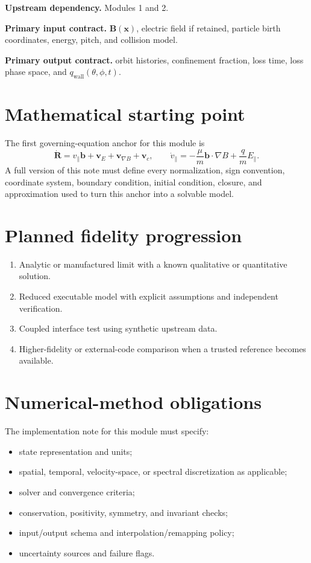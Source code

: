\documentclass[11pt]{article}
\begin{document}
\textbf{Upstream dependency.} Modules 1 and 2.

\textbf{Primary input contract.} $\mathbf B(\mathbf x)$, electric field if retained, particle birth coordinates, energy, pitch, and collision model.

\textbf{Primary output contract.} orbit histories, confinement fraction, loss time, loss phase space, and $q_{\mathrm{wall}}(\theta,\phi,t)$.

\section{Mathematical starting point}
The first governing-equation anchor for this module is
\begin{equation}
\dot{\mathbf R}=v_{\parallel}\mathbf b+\mathbf v_E+\mathbf v_{\nabla B}+\mathbf v_c,\qquad \dot v_{\parallel}=-\frac{\mu}{m}\mathbf b\cdot\nabla B+\frac{q}{m}E_{\parallel}.
\end{equation}
A full version of this note must define every normalization, sign convention, coordinate system, boundary condition, initial condition, closure, and approximation used to turn this anchor into a solvable model.

\section{Planned fidelity progression}
\begin{enumerate}[leftmargin=1.6em]
\item Analytic or manufactured limit with a known qualitative or quantitative solution.
\item Reduced executable model with explicit assumptions and independent verification.
\item Coupled interface test using synthetic upstream data.
\item Higher-fidelity or external-code comparison when a trusted reference becomes available.
\end{enumerate}

\section{Numerical-method obligations}
The implementation note for this module must specify:
\begin{itemize}[leftmargin=1.6em]
\item state representation and units;
\item spatial, temporal, velocity-space, or spectral discretization as applicable;
\item solver and convergence criteria;
\item conservation, positivity, symmetry, and invariant checks;
\item input/output schema and interpolation/remapping policy;
\item uncertainty sources and failure flags.
\end{itemize}
\end{document}

